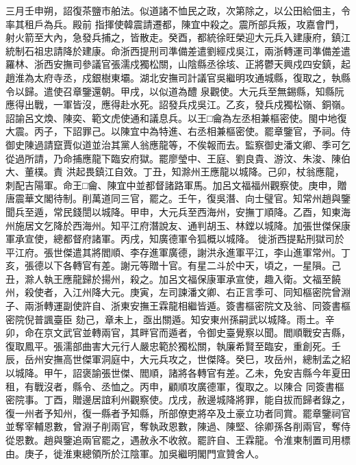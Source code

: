 \begin{pinyinscope}
 三月壬申朔，詔復茶鹽市舶法。似道諸不恤民之政，次第除之，以公田給佃主，令率其租戶為兵。殿前
 指揮使韓震請遷都，陳宜中殺之。震所部兵叛，攻嘉會門，射火箭至大內，急發兵捕之，皆散走。癸酉，都統徐旺榮迎大元兵入建康府，鎮江統制石祖忠請降於建康。命浙西提刑司準備差遣劉經戍吳江，兩浙轉運司準備差遣羅林、浙西安撫司參議官張濡戍獨松關，山陰縣丞徐垓、正將鬱天興戍四安鎮，起趙淮為太府寺丞，戍銀樹東壩。湖北安撫司計議官吳繼明攻通城縣，復取之，執縣令以歸。遣使召章鑒還朝。甲戌，以似道為醴
 泉觀使。大元兵至無錫縣，知縣阮應得出戰，一軍皆沒，應得赴水死。詔發兵戍吳江。乙亥，發兵戍獨松嶺、銅嶺。詔諭呂文煥、陳奕、範文虎使通和議息兵。以王□龠為左丞相兼樞密使。閩中地復大震。丙子，下詔罪己。以陳宜中為特進、右丞相兼樞密使。罷章鑒官，予祠。侍御史陳過請竄賈似道並治其黨人翁應龍等，不俟報而去。監察御史潘文卿、季可乞從過所請，乃命捕應龍下臨安府獄。罷廖瑩中、王庭、劉良貴、游汶、朱浚、陳伯大、董樸。責
 洪起畏鎮江自效。丁丑，知滁州王應龍以城降。己卯，杖翁應龍，刺配吉陽軍。命王□龠、陳宜中並都督諸路軍馬。加呂文福福州觀察使。庚申，贈唐震華文閣待制。削萬道同三官，罷之。壬午，復吳潛、向士璧官。知常州趙與鑒聞兵至遁，常民錢誾以城降。甲申，大元兵至西海州，安撫丁順降。乙酉，知東海州施居文乞降於西海州。知平江府潛說友、通判胡玉、林鏜以城降。加張世傑保康軍承宣使，總都督府諸軍。丙戌，知廣德軍令狐概以城降。
 徙浙西提點刑獄司於平江府。張世傑遣其將閻順、李存進軍廣德，謝洪永進軍平江，李山進軍常州。丁亥，張德以下各轉官有差。謝元等贈十官。有星二斗於中天，頃之，一星隕。己丑，滁人執王應龍歸於揚州，殺之。加呂文福保康軍承宣使，趣入衛。文福至饒州，殺使者，入江州降大元。庚寅，左司諫潘文卿、右正言季可、同知樞密院曾淵子、兩浙轉運副使許自、浙東安撫王霖龍相繼皆遁。簽書樞密院文及翁、同簽書樞密院倪普諷臺臣
 劾己，章未上，亟出關遁。知安東州孫嗣武以城降。雨土。辛卯，命在京文武官並轉兩官，其畔官而遁者，令御史臺覺察以聞。閻順戰安吉縣，復取鳳平。張濡部曲害大元行人嚴忠範於獨松關，執廉希賢至臨安，重創死。壬辰，岳州安撫高世傑軍洞庭中，大元兵攻之，世傑降。癸巳，攻岳州，總制孟之紹以城降。甲午，詔褒諭張世傑、閻順，諸將各轉官有差。乙未，免安吉縣今年夏田租，有戰沒者，縣令、丞恤之。丙申，顧順攻廣德軍，復取之。以陳合
 同簽書樞密院事。丁酉，贈邊居誼利州觀察使。戊戌，赦邊城降將罪，能自拔而歸者錄之，復一州者予知州，復一縣者予知縣，所部僚吏將卒及土豪立功者同賞。罷章鑒祠官並奪宰輔恩數，曾淵子削兩官，奪執政恩數，陳過、陳堅、徐卿孫各削兩官，奪侍從恩數。趙與鑒追兩官罷之，遇赦永不收敘。罷許自、王霖龍。令淮東制置司用標由。庚子，徙淮東總領所於江陰軍。加吳繼明閣門宣贊舍人。




\end{pinyinscope}
